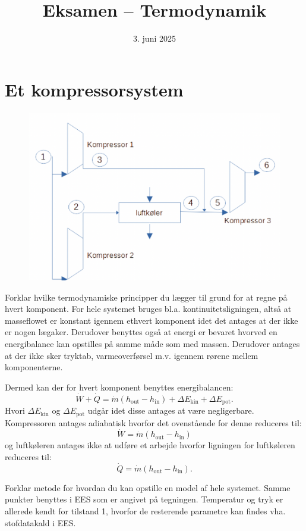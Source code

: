 \documentclass[a4paper]{article}
\title{Eksamen – Termodynamik}
\date{3. juni 2025}
\begin{document}
\maketitle

\section{Et kompressorsystem}

\begin{figure} [ht]
  \centering
  \includegraphics[width=0.5\linewidth]{./figures/e1.png}
  \caption{}
  \label{fig:e1}
\end{figure}

 Forklar hvilke termodynamiske principper du lægger til grund for at regne på hvert komponent.
\bigbreak
For hele systemet bruges bl.a. kontinuitetsligningen, altså at masseflowet er konstant igennem ethvert komponent idet det antages at der ikke er nogen lægaker. Derudover benyttes også at energi er bevaret hvorved en energibalance kan opstilles på samme måde som med massen. Derudover antages at der ikke sker tryktab, varmeoverførsel m.v. igennem rørene mellem komponenterne.

Dermed kan der for hvert komponent benyttes energibalancen:
\[ 
\dot{W} + \dot{Q} = \dot{m}(h_{\mathrm{out}} - h_{\mathrm{in}}) + \Delta E_{\mathrm{kin}} + \Delta E_{\mathrm{pot}}
.\]
Hvori $\Delta E_{\mathrm{kin}}$ og $\Delta E_{\mathrm{pot}}$ udgår idet disse antages at være negligerbare. Kompressoren antages adiabatisk hvorfor det ovenstående for denne reduceres til:
\[ 
\dot{W} = \dot{m} (h_{\mathrm{out}} - h_{\mathrm{in}})
\]
og luftkøleren antages ikke at udføre et arbejde hvorfor ligningen for luftkøleren reduceres til:
\[ 
\dot{Q} = \dot{m} \left( h_{\mathrm{out}} - h_{\mathrm{in}} \right)
.\]


 Forklar metode for hvordan du kan opstille en model af hele systemet.
\bigbreak
Samme punkter benyttes i EES som er angivet på tegningen. Temperatur og tryk er allerede kendt for tilstand 1, hvorfor de resterende parametre kan findes vha. stofdatakald i EES. 
\end{document}
